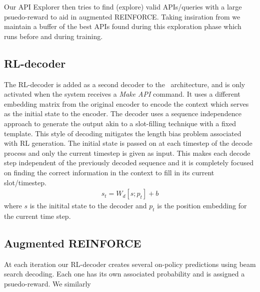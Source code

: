 Our API Explorer then tries to find (explore) valid APIs/queries with a large psuedo-reward to aid in augmented REINFORCE. Taking insiration from \cite{NIPS2018_8204} we maintain a buffer of the best APIs found during this exploration phase which runs before and during training.

\subsection{RL-decoder}
\label{ssec:rldecode}
The RL-decoder is added as a second decoder to the \sys\ architecture, and is only activated when the system receives a {\em Make API} command. It uses a different embedding matrix from the original encoder to encode the context which serves as the initial state to the encoder. The decoder uses a sequence independence approach to generate the output akin to a slot-filling technique with a fixed template. This style of decoding mitigates the length bias problem associated with RL generation. The initial state is passed on at each timestep of the decode process and only the current timestep is given as input. This makes each decode step independent of the previously decoded sequence and it is completely focused on finding the correct information in the context to fill in its current slot/timestep.
\begin{gather}
s_{t} = W_d [s;p_t] + b
\end{gather}
where $s$ is the initital state to the decoder and $p_t$ is the position embedding for the current time step.

\subsection{Augmented REINFORCE}
At each iteration our RL-decoder creates several on-policy predictions using beam search decoding. Each one has its own associated probability and is assigned a psuedo-reward. We similarly 
